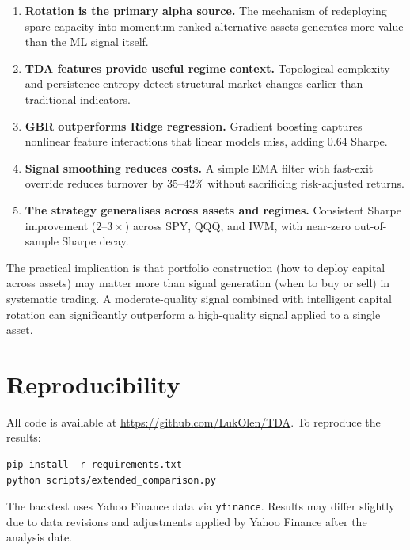 \documentclass[11pt, a4paper]{article}
\begin{document}
\begin{enumerate}[nosep]
    \item \textbf{Rotation is the primary alpha source.} The mechanism of redeploying spare capacity into momentum-ranked alternative assets generates more value than the ML signal itself.
    \item \textbf{TDA features provide useful regime context.} Topological complexity and persistence entropy detect structural market changes earlier than traditional indicators.
    \item \textbf{GBR outperforms Ridge regression.} Gradient boosting captures nonlinear feature interactions that linear models miss, adding 0.64 Sharpe.
    \item \textbf{Signal smoothing reduces costs.} A simple EMA filter with fast-exit override reduces turnover by 35--42\% without sacrificing risk-adjusted returns.
    \item \textbf{The strategy generalises across assets and regimes.} Consistent Sharpe improvement ($2$--$3\times$) across SPY, QQQ, and IWM, with near-zero out-of-sample Sharpe decay.
\end{enumerate}

The practical implication is that portfolio construction (how to deploy capital across assets) may matter more than signal generation (when to buy or sell) in systematic trading. A moderate-quality signal combined with intelligent capital rotation can significantly outperform a high-quality signal applied to a single asset.

\section*{Reproducibility}

All code is available at \url{https://github.com/LukOlen/TDA}. To reproduce the results:

\begin{verbatim}
pip install -r requirements.txt
python scripts/extended_comparison.py
\end{verbatim}

The backtest uses Yahoo Finance data via \texttt{yfinance}. Results may differ slightly due to data revisions and adjustments applied by Yahoo Finance after the analysis date.
\end{document}
